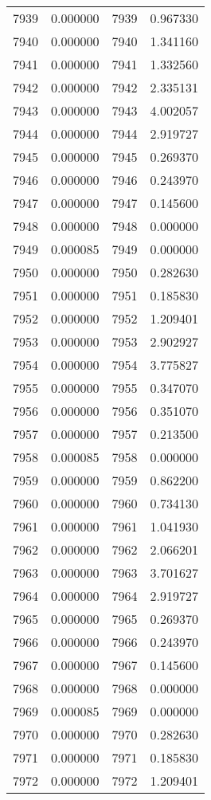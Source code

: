 \documentclass[12pt]{article}
\begin{document}
\begin{longtable}{@{}cccc@{}}
7939 & 0.000000 & 7939 & 0.967330 \\
7940 & 0.000000 & 7940 & 1.341160 \\
7941 & 0.000000 & 7941 & 1.332560 \\
7942 & 0.000000 & 7942 & 2.335131 \\
7943 & 0.000000 & 7943 & 4.002057 \\
7944 & 0.000000 & 7944 & 2.919727 \\
7945 & 0.000000 & 7945 & 0.269370 \\
7946 & 0.000000 & 7946 & 0.243970 \\
7947 & 0.000000 & 7947 & 0.145600 \\
7948 & 0.000000 & 7948 & 0.000000 \\
7949 & 0.000085 & 7949 & 0.000000 \\
7950 & 0.000000 & 7950 & 0.282630 \\
7951 & 0.000000 & 7951 & 0.185830 \\
7952 & 0.000000 & 7952 & 1.209401 \\
7953 & 0.000000 & 7953 & 2.902927 \\
7954 & 0.000000 & 7954 & 3.775827 \\
7955 & 0.000000 & 7955 & 0.347070 \\
7956 & 0.000000 & 7956 & 0.351070 \\
7957 & 0.000000 & 7957 & 0.213500 \\
7958 & 0.000085 & 7958 & 0.000000 \\
7959 & 0.000000 & 7959 & 0.862200 \\
7960 & 0.000000 & 7960 & 0.734130 \\
7961 & 0.000000 & 7961 & 1.041930 \\
7962 & 0.000000 & 7962 & 2.066201 \\
7963 & 0.000000 & 7963 & 3.701627 \\
7964 & 0.000000 & 7964 & 2.919727 \\
7965 & 0.000000 & 7965 & 0.269370 \\
7966 & 0.000000 & 7966 & 0.243970 \\
7967 & 0.000000 & 7967 & 0.145600 \\
7968 & 0.000000 & 7968 & 0.000000 \\
7969 & 0.000085 & 7969 & 0.000000 \\
7970 & 0.000000 & 7970 & 0.282630 \\
7971 & 0.000000 & 7971 & 0.185830 \\
7972 & 0.000000 & 7972 & 1.209401 \\

\end{longtable}
\end{document}
